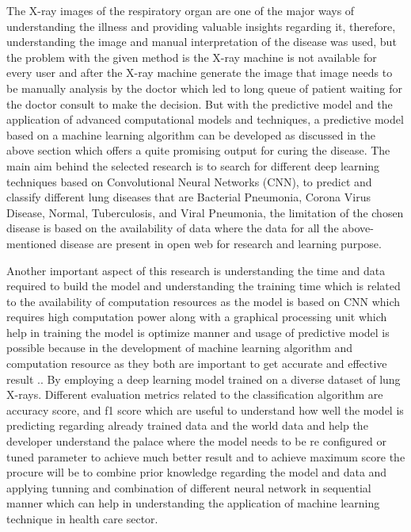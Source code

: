  The X-ray images of the respiratory organ are one of the major ways of understanding the illness and providing valuable insights regarding it, therefore, understanding the image and manual interpretation of the disease was used, but the problem with the given method is the X-ray machine is not available for every user and after the X-ray machine generate the image that image needs to be manually analysis by the doctor which led to long queue of patient waiting for the doctor consult to make the decision. But with the predictive model and the application of advanced computational models and techniques, a predictive model based on a machine learning algorithm can be developed as discussed in the above section which offers a quite promising output for curing the disease\cite{rawat2017deep}. The main aim behind the selected research is to search for different deep learning techniques based on Convolutional Neural Networks (CNN), to predict and classify different lung diseases that are  Bacterial Pneumonia, Corona Virus Disease, Normal, Tuberculosis, and Viral Pneumonia, the limitation of the chosen disease is based on the availability of data where the data for all the above-mentioned disease are present in open web for research and learning purpose. 

\textbf{}

Another important aspect of this research is understanding the time and data required to build the model and understanding the training time which is related to the availability of computation resources as the model is based on CNN which requires high computation power along with a graphical processing unit which help in training the model is optimize manner and usage of predictive model is possible because in the development of machine learning algorithm and computation resource as they both are important to get accurate and effective result .. By employing a deep learning model trained on a diverse dataset of lung X-rays\cite{rawat2017deep}. Different evaluation metrics related to the classification algorithm are accuracy score, and f1 score which are useful to understand how well the model is predicting regarding already trained data and the world data and help the developer understand the palace where the model needs to be re configured or tuned parameter to achieve much better result and to achieve maximum score the procure will be to combine prior knowledge regarding the model and data and applying tunning and combination of different neural network in sequential manner which can help in understanding the application of machine learning technique in health care sector\cite{powers2020evaluation}.

